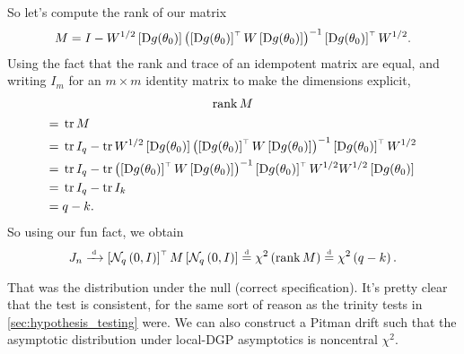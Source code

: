 \documentclass[11pt,letterpaper,reqno,oneside]{article}
\begin{document}
So let's compute the rank of our matrix
%
\begin{equation*}
	M = I
	- W^{1/2} \left[ \mathrm{D} g( \theta_0 ) \right] 
	\left( \left[ \mathrm{D} g(\theta_0) \right]^{\scriptscriptstyle \top} 
	W \left[ \mathrm{D} g(\theta_0) \right] \right)^{-1}
	\left[ \mathrm{D} g(\theta_0) \right]^{\scriptscriptstyle \top} W^{1/2} .
\end{equation*}
%
Using the fact that the rank and trace of an idempotent matrix are equal, and writing $I_m$ for an $m \times m$ identity matrix to make the dimensions explicit,
%
\begin{multline*}
	\operatorname*{rank} M
	\\
	\begin{aligned}
	={}& \operatorname*{tr} M
	\\
	={}& \operatorname*{tr} I_q
	- \operatorname*{tr} W^{1/2} \left[ \mathrm{D} g( \theta_0 ) \right] 
	\left( \left[ \mathrm{D} g(\theta_0) \right]^{\scriptscriptstyle \top} 
	W \left[ \mathrm{D} g(\theta_0) \right] \right)^{-1}
	\left[ \mathrm{D} g(\theta_0) \right]^{\scriptscriptstyle \top} W^{1/2}
	\\
	={}& \operatorname*{tr} I_q
	- \operatorname*{tr} 
	\left( \left[ \mathrm{D} g(\theta_0) \right]^{\scriptscriptstyle \top} 
	W \left[ \mathrm{D} g(\theta_0) \right] \right)^{-1}
	\left[ \mathrm{D} g(\theta_0) \right]^{\scriptscriptstyle \top} W^{1/2}
	W^{1/2} \left[ \mathrm{D} g( \theta_0 ) \right] 
	\\
	={}& \operatorname*{tr} I_q
	- \operatorname*{tr} I_k
	\\
	={}& q - k .
	\end{aligned}
\end{multline*}
%
So using our fun fact, we obtain
%
\begin{equation*}
	J_n
	\xrightarrow{{\scriptscriptstyle \mathrm{\;d\;}}} 
	\left[ \mathcal{N}_q\left( 0, I \right) \right]^{\scriptscriptstyle \top} 
	M
	\left[ \mathcal{N}_q\left( 0, I \right) \right] 
	\protect\overset{{\scriptscriptstyle \mathrm{d}}}{=} \chi^2\left( \operatorname*{rank} M \right) 
	\protect\overset{{\scriptscriptstyle \mathrm{d}}}{=} \chi^2\left( q-k \right) .
\end{equation*}


That was the distribution under the null (correct specification). It's pretty clear that the test is consistent, for the same sort of reason as the trinity tests in \cref{sec:hypothesis_testing} were. We can also construct a Pitman drift such that the asymptotic distribution under local-DGP asymptotics is noncentral $\chi^2$.







\end{document}

